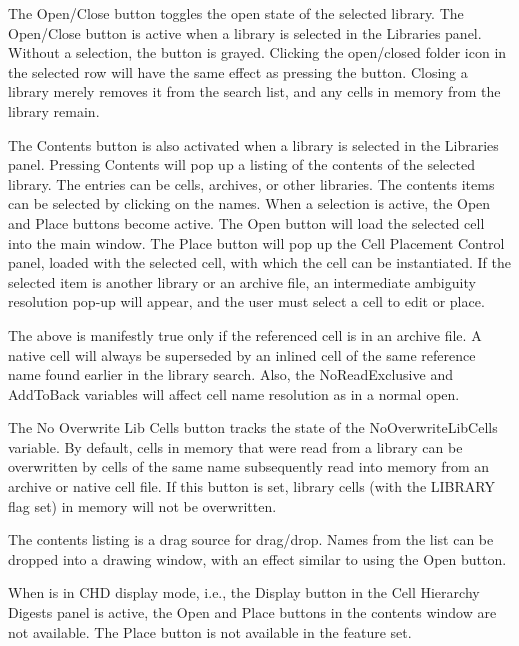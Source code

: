 The {\cb Open/Close} button toggles the open state of the selected
library.  The {\cb Open/Close} button is active when a library is
selected in the {\cb Libraries} panel.  Without a selection, the
button is grayed.  Clicking the open/closed folder icon in the
selected row will have the same effect as pressing the button. 
Closing a library merely removes it from the search list, and any
cells in memory from the library remain.

The {\cb Contents} button is also activated when a library is selected
in the {\cb Libraries} panel.  Pressing {\cb Contents} will pop up a
listing of the contents of the selected library.  The entries can be
cells, archives, or other libraries.  The contents items can be
selected by clicking on the names.  When a selection is active, the
{\cb Open} and {\cb Place} buttons become active.  The {\cb Open}
button will load the selected cell into the main window.  The {\cb
Place} button will pop up the {\cb Cell Placement Control} panel,
loaded with the selected cell, with which the cell can be
instantiated.  If the selected item is another library or an archive
file, an intermediate ambiguity resolution pop-up will appear, and the
user must select a cell to edit or place.

The above is manifestly true only if the referenced cell is in an
archive file.  A native cell will always be superseded by an inlined
cell of the same reference name found earlier in the library search. 
Also, the {\et NoReadExclusive} and {\et AddToBack} variables will
affect cell name resolution as in a normal open.

The {\cb No Overwrite Lib Cells} button tracks the state of the {\et
NoOverwriteLibCells} variable.  By default, cells in memory that were
read from a library can be overwritten by cells of the same name
subsequently read into memory from an archive or native cell file.  If
this button is set, library cells (with the LIBRARY flag set) in
memory will not be overwritten.

The contents listing is a drag source for drag/drop.  Names from the
list can be dropped into a drawing window, with an effect similar to
using the {\cb Open} button.

When {\Xic} is in CHD display mode, i.e., the {\cb Display} button in
the {\cb Cell Hierarchy Digests} panel is active, the {\cb Open} and
{\cb Place} buttons in the contents window are not available.  The
{\cb Place} button is not available in the {\Xiv} feature set.


